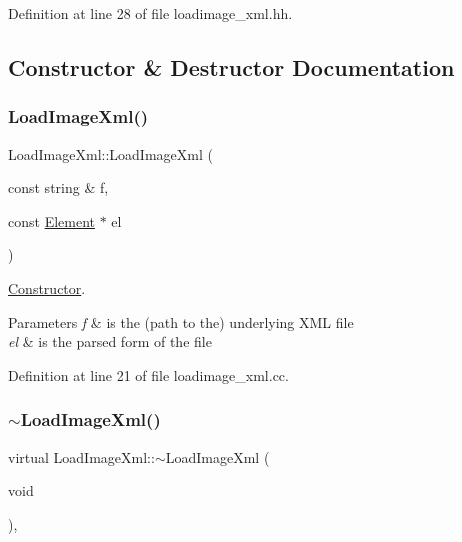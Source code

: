 Definition at line 28 of file loadimage\+\_\+xml.\+hh.



\subsection{Constructor \& Destructor Documentation}
\mbox{\label{class_load_image_xml_a8400e67a31d8217d0ac08fe7b9c61d86}} 
\subsubsection{\texorpdfstring{LoadImageXml()}{LoadImageXml()}}
{\footnotesize\ttfamily Load\+Image\+Xml\+::\+Load\+Image\+Xml (\begin{DoxyParamCaption}\item[{const string \&}]{f,  }\item[{const \mbox{\hyperlink{class_element}{Element}} $\ast$}]{el }\end{DoxyParamCaption})}



\mbox{\hyperlink{class_constructor}{Constructor}}. 


\begin{DoxyParams}{Parameters}
{\em f} & is the (path to the) underlying X\+ML file \\
\hline
{\em el} & is the parsed form of the file \\
\hline
\end{DoxyParams}


Definition at line 21 of file loadimage\+\_\+xml.\+cc.

\mbox{\label{class_load_image_xml_ab6988ec5d5f59f559db6eeac141e4e73}} 
\subsubsection{\texorpdfstring{$\sim$LoadImageXml()}{~LoadImageXml()}}
{\footnotesize\ttfamily virtual Load\+Image\+Xml\+::$\sim$\+Load\+Image\+Xml (\begin{DoxyParamCaption}\item[{void}]{ }\end{DoxyParamCaption})\hspace{0.3cm}{\ttfamily [inline]}, {\ttfamily [virtual]}}



